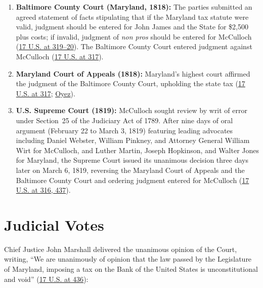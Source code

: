 \documentclass[12pt]{article}
\begin{document}
\begin{enumerate}
    \item \textbf{Baltimore County Court (Maryland, 1818):} The parties submitted an agreed statement of facts stipulating that if the Maryland tax statute were valid, judgment should be entered for John James and the State for \$2,500 plus costs; if invalid, judgment of \textit{non pros} should be entered for McCulloch (\href{https://supreme.justia.com/cases/federal/us/17/316/}{17 U.S. at 319--20}). The Baltimore County Court entered judgment against McCulloch (\href{https://supreme.justia.com/cases/federal/us/17/316/}{17 U.S. at 317}).
    \item \textbf{Maryland Court of Appeals (1818):} Maryland's highest court affirmed the judgment of the Baltimore County Court, upholding the state tax (\href{https://supreme.justia.com/cases/federal/us/17/316/}{17 U.S. at 317}; \href{https://www.oyez.org/cases/1789-1850/17us316}{Oyez}).
    \item \textbf{U.S. Supreme Court (1819):} McCulloch sought review by writ of error under Section~25 of the Judiciary Act of 1789. After nine days of oral argument (February 22 to March 3, 1819) featuring leading advocates including Daniel Webster, William Pinkney, and Attorney General William Wirt for McCulloch, and Luther Martin, Joseph Hopkinson, and Walter Jones for Maryland, the Supreme Court issued its unanimous decision three days later on March 6, 1819, reversing the Maryland Court of Appeals and the Baltimore County Court and ordering judgment entered for McCulloch (\href{https://supreme.justia.com/cases/federal/us/17/316/}{17 U.S. at 316, 437}).
\end{enumerate}

\section{Judicial Votes}

Chief Justice John Marshall delivered the unanimous opinion of the Court, writing, ``We are unanimously of opinion that the law passed by the Legislature of Maryland, imposing a tax on the Bank of the United States is unconstitutional and void'' (\href{https://supreme.justia.com/cases/federal/us/17/316/}{17 U.S. at 436}):
\end{document}

